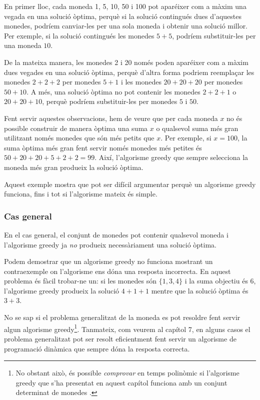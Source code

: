 En primer lloc, cada moneda 1, 5, 10, 50 i 100
pot aparéixer com a màxim una vegada en una solució òptima,
perquè si la solució contingués dues d'aquestes monedes,
podríem canviar-les per una sola moneda i
obtenir una solució millor.
Per exemple, si la solució contingués
les monedes $5+5$, podríem substituir-les per una moneda $10$.

De la mateixa manera, les monedes 2 i 20
només poden aparéixer com a màxim dues vegades en una
solució òptima, perquè d'altra forma podriem reemplaçar
les monedes $2+2+2$ per monedes $5+1$ i
les monedes $20+20+20$ per monedes $50+10$.
A més, una solució òptima no pot contenir
les monedes $2+2+1$ o $20+20+10$,
perquè podríem substituir-les per monedes $5$ i $50$.

Fent servir aquestes observacions,
hem de veure que per cada moneda $x$
no és possible construir de manera òptima
una suma $x$ o qualsevol suma més gran utilitzant només monedes
que són més petits que $x$.
Per exemple, si $x=100$, la suma òptima més gran fent
servir només monedes més petites és $50+20+20+5+2+2=99$.
Així, l'algorisme greedy que sempre selecciona
la moneda més gran produeix la solució òptima.

Aquest exemple mostra que pot ser difícil argumentar perquè un
algorisme greedy funciona, fins i tot si l'algorisme mateix és
simple.

\subsubsection{Cas general}

En el cas general, el conjunt de monedes pot contenir qualsevol moneda
i l'algorisme greedy ja \emph{no} produeix necessàriament
una solució òptima.

Podem demostrar que un algorisme greedy no funciona
mostrant un contraexemple
on l'algorisme ens dóna una resposta incorrecta.
En aquest problema és fàcil trobar-ne un:
si les monedes són $\{1,3,4\}$ i la suma objectiu
és 6, l'algorisme greedy produeix la solució
$4+1+1$ mentre que la solució òptima és $3+3$.

No se sap si el problema generalitzat de la moneda
es pot resoldre fent servir algun algorisme greedy\footnote{
No obstant això, és possible
\emph{comprovar} en temps polinòmic
si l'algorisme greedy que s'ha presentat en aquest capítol funciona
amb un conjunt determinat de monedes \cite{pea05}.}.
Tanmateix, com veurem al capítol 7,
en alguns casos el problema generalitzat pot ser
resolt eficientment fent servir un algorisme de programació
dinàmica que sempre dóna la resposta correcta.

